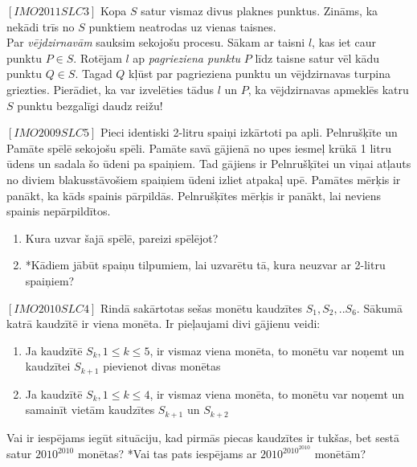 \begin{problem}
$[IMO2011SLC3]$
Kopa  $S$ satur vismaz divus plaknes punktus. Zināms, ka nekādi trīs no $S$ punktiem neatrodas uz vienas taisnes.\\
Par \textit{vējdzirnavām} sauksim sekojošu procesu. Sākam ar taisni $l$, kas iet caur punktu $P\in S$. Rotējam $l$ ap \textit{pagrieziena punktu} $P$ līdz taisne satur vēl kādu punktu $Q \in S$. Tagad $Q$ kļūst par pagrieziena punktu un vējdzirnavas turpina griezties.
Pierādiet, ka var izvelēties tādus $l$ un $P$, ka vējdzirnavas apmeklēs katru $S$ punktu bezgalīgi daudz reižu!
\end{problem}

\begin{problem}
$[IMO2009SLC5]$
Pieci identiski 2-litru spaiņi izkārtoti pa apli. Pelnrušķīte un Pamāte spēlē sekojošu spēli. Pamāte savā gājienā no upes iesmeļ krūkā 1 litru ūdens un sadala šo ūdeni pa spaiņiem. Tad gājiens ir Pelnrušķītei un viņai atļauts no diviem blakusstāvošiem spaiņiem ūdeni izliet atpakaļ upē. Pamātes mērķis ir panākt, ka kāds spainis pārpildās. Pelnrušķītes mērķis ir panākt, lai neviens spainis nepārpildītos.
\begin{enumerate}
\item Kura uzvar šajā spēlē, pareizi spēlējot?
\item *Kādiem jābūt spaiņu tilpumiem, lai uzvarētu tā, kura neuzvar ar 2-litru spaiņiem?
\end{enumerate}
\end{problem}

\begin{problem}
$[IMO2010SLC4]$
Rindā sakārtotas sešas monētu kaudzītes $S_1, S_2 ,.. S_6$. Sākumā katrā kaudzītē ir viena monēta. Ir pieļaujami divi gājienu veidi:
\renewcommand{\theenumi}{\roman{enumi}}
\begin{enumerate}
\item Ja kaudzītē $S_k, 1\leq k \leq 5$, ir vismaz viena monēta, to monētu var noņemt un kaudzītei $S_{k+1}$ pievienot divas monētas
\item Ja kaudzītē $S_k, 1\leq k \leq 4$, ir vismaz viena monēta, to monētu var noņemt un samainīt vietām kaudzītes $S_{k+1}$ un $S_{k+2}$
\end{enumerate}
Vai ir iespējams iegūt situāciju, kad pirmās piecas kaudzītes ir tukšas, bet sestā satur $2010^{2010}$ monētas? *Vai tas pats iespējams ar $2010^{2010^{2010}}$ monētām?
\end{problem}


